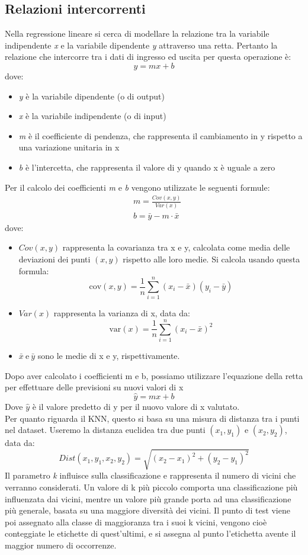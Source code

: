 \documentclass[11pt]{article}
\theoremstyle{definition}
\begin{document}
\subsection{Relazioni intercorrenti}
Nella regressione lineare si cerca di modellare la relazione tra la variabile indipendente \textit{x} e la variabile dipendente \textit{y} attraverso una retta. Pertanto la relazione che intercorre tra i dati di ingresso ed uscita per questa operazione è:
$$
y=mx+b
$$
dove:
\begin{itemize}
\item \textit{y} è la variabile dipendente (o di output)
\item \textit{x} è la variabile indipendente (o di input)
\item \textit{m} è il coefficiente di pendenza, che rappresenta il cambiamento in y rispetto a una variazione unitaria in x
\item \textit{b} è l'intercetta, che rappresenta il valore di y quando x è uguale a zero
\end{itemize}
Per il calcolo dei coefficienti \textit{m} e \textit{b} vengono utilizzate le seguenti formule:
\begin{align*}
&m = \frac{Cov(x,y)}{Var(x)}\\
&b=\bar{y}-m\cdot \bar{x}
\end{align*}
dove:
\begin{itemize}
\item $Cov(x,y)$ rappresenta la covarianza tra x e y, calcolata come media delle deviazioni dei punti $(x,y)$ rispetto alle loro medie. Si calcola usando questa formula:
$$
\text{cov}(x, y) = \frac{1}{n} \sum_{i=1}^{n} (x_i - \bar{x})(y_i - \bar{y})
$$
\item $Var(x)$ rappresenta la varianza di x, data da:
$$
\text{var}(x) = \frac{1}{n} \sum_{i=1}^{n} (x_i - \bar{x})^2
$$
\item $\bar{x} \ \text{e} \ \bar{y}$ sono le medie di x e y, rispettivamente.
\end{itemize}
Dopo aver calcolato i coefficienti m e b, possiamo utilizzare l'equazione della retta per effettuare delle previsioni su nuovi valori di x
$$
\hat{y} = mx+b
$$
Dove $\hat{y}$ è il valore predetto di y per il nuovo valore di x valutato.  \\
\newline
Per quanto riguarda il KNN, questo si basa su una misura di distanza tra i punti nel dataset. Useremo la distanza euclidea tra due punti $(x_1,y_1)$ e $(x_2,y_2)$, data da:
$$
Dist(x_1,y_1,x_2,y_2)=\sqrt{(x_2-x_1)^2 + (y_2-y_1)^2}
$$ 
Il parametro \textit{k} influisce sulla classificazione e rappresenta il numero di vicini che verranno considerati. Un valore di k più piccolo comporta una classificazione più influenzata dai vicini, mentre un valore più grande porta ad una classificazione più generale, basata su una maggiore diversità dei vicini. Il punto di test viene poi assegnato alla classe di maggioranza tra i suoi k vicini, vengono cioè conteggiate le etichette di quest'ultimi, e si assegna al punto l'etichetta avente il maggior numero di occorrenze.
\end{document}
